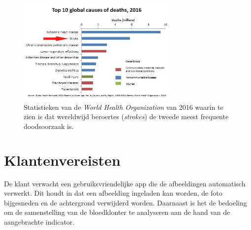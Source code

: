 \documentclass[a4paper,kulak]{kulakarticle}
\begin{document}
		\begin{figure}[H]
			\centering
			\includegraphics[width = 0.7\textwidth]{top10doodsoorzaken.png}
			
			\caption{Statistieken van de \textit{World Health Organization} van 2016 waarin te zien is dat wereldwijd beroertes (\textit{strokes}) de tweede meest frequente doodsoorzaak is.}
			\label{figuur doodsoorzaken}
		\end{figure}
	\newpage
		
	\tableofcontents

	\newpage
		
	\section{Klantenvereisten}
		De klant verwacht een gebruiksvriendelijke app die de afbeeldingen automatisch verwerkt. Dit houdt in dat een afbeelding ingeladen kan worden, de foto bijgesneden en de achtergrond verwijderd worden. Daarnaast is het de bedoeling om de samenstelling van de bloedklonter te analyseren aan de hand van de aangebrachte indicator.
	
\end{document}
